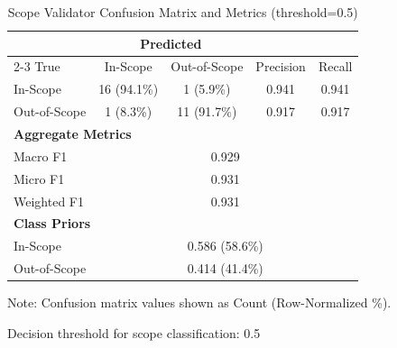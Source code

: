 \begin{table}[htbp]
\centering
\caption{Scope Validator Confusion Matrix and Metrics (threshold=0.5)}
\label{tab:scope_confusion}
\begin{tabular}{lcccc}
\toprule
& \multicolumn{2}{c}{Predicted} & & \\
\cmidrule{2-3}
True & In-Scope & Out-of-Scope & Precision & Recall \\
\midrule
In-Scope & 16 (94.1\%) & 1 (5.9\%) & 0.941 & 0.941 \\
Out-of-Scope & 1 (8.3\%) & 11 (91.7\%) & 0.917 & 0.917 \\
\midrule
\multicolumn{5}{l}{\textbf{Aggregate Metrics}} \\
\midrule
Macro F1 & \multicolumn{4}{c}{0.929} \\
Micro F1 & \multicolumn{4}{c}{0.931} \\
Weighted F1 & \multicolumn{4}{c}{0.931} \\
\midrule
\multicolumn{5}{l}{\textbf{Class Priors}} \\
\midrule
In-Scope & \multicolumn{4}{c}{0.586 (58.6\%)} \\
Out-of-Scope & \multicolumn{4}{c}{0.414 (41.4\%)} \\
\bottomrule
\end{tabular}
\begin{tablenotes}
\small
\item Note: Confusion matrix values shown as Count (Row-Normalized \%).
\item Decision threshold for scope classification: 0.5
\end{tablenotes}
\end{table}
